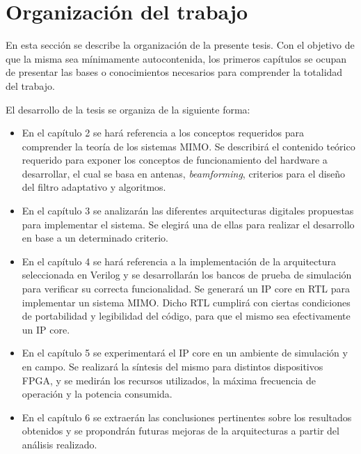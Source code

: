 \newpage

\section{Organización del trabajo}

En esta sección se describe la organización de la presente tesis. Con el objetivo de que la misma sea mínimamente
autocontenida, los primeros capítulos se ocupan de presentar las bases o conocimientos necesarios para comprender la
totalidad del trabajo.

El desarrollo de la tesis se organiza de la siguiente forma:

\begin{itemize}
\item En el capítulo 2 se hará referencia a los conceptos requeridos para comprender la teoría de los sistemas MIMO. Se describirá el contenido teórico requerido para exponer los conceptos de funcionamiento del hardware a desarrollar, el cual se basa en antenas, \textit{beamforming}, criterios para el diseño del filtro adaptativo y algoritmos.
\item En el capítulo 3 se analizarán las diferentes arquitecturas digitales propuestas para implementar el sistema. Se elegirá una de ellas para realizar el desarrollo en base a un determinado criterio.
\item En el capítulo 4 se hará referencia a la implementación de la arquitectura seleccionada en Verilog y se desarrollarán los bancos de prueba de simulación para verificar su correcta funcionalidad. Se generará un IP core en RTL para implementar un sistema MIMO. Dicho RTL cumplirá con ciertas condiciones de portabilidad y legibilidad del código, para que el mismo sea efectivamente un IP core.
\item En el capítulo 5 se experimentará el IP core en un ambiente de simulación y en campo. Se realizará la síntesis del mismo para distintos dispositivos FPGA, y se medirán los recursos utilizados, la máxima frecuencia de operación y la potencia consumida.
\item En el capítulo 6 se extraerán las conclusiones pertinentes sobre los resultados obtenidos y se propondrán futuras mejoras de la arquitecturas a partir del análisis realizado.
\end{itemize}